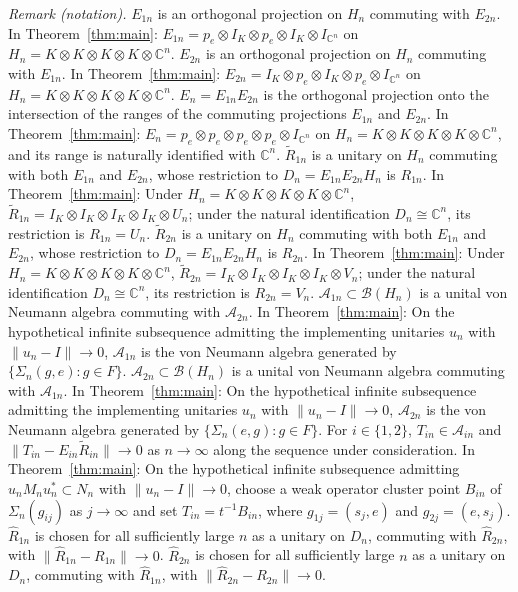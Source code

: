 \noindent\textit{Remark (notation).} $E_{1n}$ is an orthogonal projection on $H_n$ commuting with $E_{2n}$. In Theorem~\ref{thm:main}: $E_{1n}=p_e\otimes I_K\otimes p_e\otimes I_K\otimes I_{\mathbb C^n}$ on $H_n=K\otimes K\otimes K\otimes K\otimes\mathbb C^n$. $E_{2n}$ is an orthogonal projection on $H_n$ commuting with $E_{1n}$. In Theorem~\ref{thm:main}: $E_{2n}=I_K\otimes p_e\otimes I_K\otimes p_e\otimes I_{\mathbb C^n}$ on $H_n=K\otimes K\otimes K\otimes K\otimes\mathbb C^n$. $E_n=E_{1n}E_{2n}$ is the orthogonal projection onto the intersection of the ranges of the commuting projections $E_{1n}$ and $E_{2n}$. In Theorem~\ref{thm:main}: $E_n=p_e\otimes p_e\otimes p_e\otimes p_e\otimes I_{\mathbb C^n}$ on $H_n=K\otimes K\otimes K\otimes K\otimes\mathbb C^n$, and its range is naturally identified with $\mathbb C^n$. $\widetilde R_{1n}$ is a unitary on $H_n$ commuting with both $E_{1n}$ and $E_{2n}$, whose restriction to $D_n=E_{1n}E_{2n}H_n$ is $R_{1n}$. In Theorem~\ref{thm:main}: Under $H_n=K\otimes K\otimes K\otimes K\otimes\mathbb C^n$, $\widetilde R_{1n}=I_K\otimes I_K\otimes I_K\otimes I_K\otimes U_n$; under the natural identification $D_n\cong\mathbb C^n$, its restriction is $R_{1n}=U_n$. $\widetilde R_{2n}$ is a unitary on $H_n$ commuting with both $E_{1n}$ and $E_{2n}$, whose restriction to $D_n=E_{1n}E_{2n}H_n$ is $R_{2n}$. In Theorem~\ref{thm:main}: Under $H_n=K\otimes K\otimes K\otimes K\otimes\mathbb C^n$, $\widetilde R_{2n}=I_K\otimes I_K\otimes I_K\otimes I_K\otimes V_n$; under the natural identification $D_n\cong\mathbb C^n$, its restriction is $R_{2n}=V_n$. $\mathcal A_{1n}\subset\mathcal B(H_n)$ is a unital von Neumann algebra commuting with $\mathcal A_{2n}$. In Theorem~\ref{thm:main}: On the hypothetical infinite subsequence admitting the implementing unitaries $u_n$ with $\|u_n-I\|\to0$, $\mathcal A_{1n}$ is the von Neumann algebra generated by $\{\Sigma_n(g,e):g\in F\}$. $\mathcal A_{2n}\subset\mathcal B(H_n)$ is a unital von Neumann algebra commuting with $\mathcal A_{1n}$. In Theorem~\ref{thm:main}: On the hypothetical infinite subsequence admitting the implementing unitaries $u_n$ with $\|u_n-I\|\to0$, $\mathcal A_{2n}$ is the von Neumann algebra generated by $\{\Sigma_n(e,g):g\in F\}$. For $i\in\{1,2\}$, $T_{in}\in\mathcal A_{in}$ and $\|T_{in}-E_{in}\widetilde R_{in}\|\longrightarrow0$ as $n\to\infty$ along the sequence under consideration. In Theorem~\ref{thm:main}: On the hypothetical infinite subsequence admitting $u_nM_nu_n^*\subset N_n$ with $\|u_n-I\|\to0$, choose a weak operator cluster point $B_{in}$ of $\Sigma_n(g_{ij})$ as $j\to\infty$ and set $T_{in}=t^{-1}B_{in}$, where $g_{1j}=(s_j,e)$ and $g_{2j}=(e,s_j)$. $\widehat R_{1n}$ is chosen for all sufficiently large $n$ as a unitary on $D_n$, commuting with $\widehat R_{2n}$, with $\|\widehat R_{1n}-R_{1n}\|\longrightarrow0$. $\widehat R_{2n}$ is chosen for all sufficiently large $n$ as a unitary on $D_n$, commuting with $\widehat R_{1n}$, with $\|\widehat R_{2n}-R_{2n}\|\longrightarrow0$.


